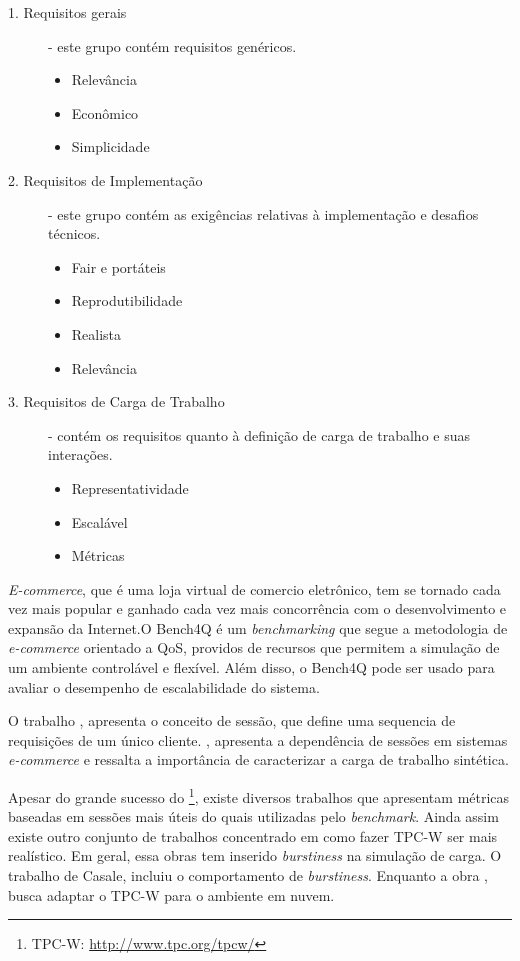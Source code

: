 \begin{description}
	\item[1. Requisitos gerais] - este grupo contém requisitos genéricos. 
	\begin{itemize}
		\item Relevância
		\item Econômico
		\item Simplicidade
	\end{itemize}
	
	\item[2. Requisitos de Implementação] - este grupo contém as exigências relativas à implementação e desafios técnicos. \hfill 
	\begin{itemize}
		\item Fair e portáteis
		\item Reprodutibilidade
		\item Realista
		\item Relevância
	\end{itemize}
	
	\item[3. Requisitos de Carga de Trabalho ] - contém os requisitos quanto à definição de carga de trabalho e suas interações. \hfill 
	\begin{itemize}
		\item Representatividade
		\item Escalável
		\item Métricas
	\end{itemize}
	
\end{description}


\textit{E-commerce}, que é uma loja virtual de comercio eletrônico, tem se tornado cada vez mais popular e ganhado cada vez mais concorrência com o desenvolvimento e expansão da Internet.O Bench4Q é um \textit{benchmarking} que segue a metodologia de \textit{e-commerce} orientado a QoS, providos de recursos que permitem a simulação de um ambiente controlável e flexível. Além disso, o Bench4Q pode ser usado para avaliar o desempenho de escalabilidade do sistema.

O trabalho , apresenta o conceito de sessão, que define uma sequencia de requisições de um único cliente. , apresenta a dependência de sessões em sistemas \textit{e-commerce} e ressalta a importância de caracterizar a carga de trabalho sintética.

Apesar do grande sucesso do  \footnote{TPC-W: \url{http://www.tpc.org/tpcw/}}, existe diversos trabalhos que apresentam métricas baseadas em sessões mais úteis do quais utilizadas pelo \textit{benchmark}. Ainda assim existe outro conjunto de trabalhos concentrado em como fazer TPC-W ser mais realístico. Em geral, essa obras tem inserido \textit{burstiness} na simulação de carga. O trabalho  de Casale, incluiu o comportamento de \textit{burstiness}. Enquanto a obra , busca adaptar o TPC-W para o ambiente em nuvem.

